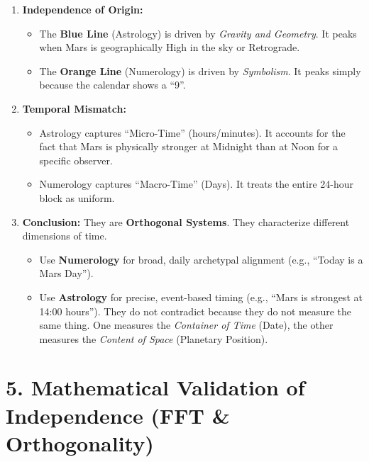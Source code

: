 \documentclass[
  11pt,
  oneside,
  openany]{scrbook}
\providecommand{\tightlist}{%
  \setlength{\itemsep}{0pt}\setlength{\parskip}{0pt}}\usepackage{longtable,booktabs,array}
\begin{document}
\begin{enumerate}
\def\labelenumi{\arabic{enumi}.}
\tightlist
\item
  \textbf{Independence of Origin:}

  \begin{itemize}
  \tightlist
  \item
    The \textbf{Blue Line} (Astrology) is driven by \emph{Gravity and
    Geometry}. It peaks when Mars is geographically High in the sky or
    Retrograde.
  \item
    The \textbf{Orange Line} (Numerology) is driven by \emph{Symbolism}.
    It peaks simply because the calendar shows a ``9''.
  \end{itemize}
\item
  \textbf{Temporal Mismatch:}

  \begin{itemize}
  \tightlist
  \item
    Astrology captures ``Micro-Time'' (hours/minutes). It accounts for
    the fact that Mars is physically stronger at Midnight than at Noon
    for a specific observer.
  \item
    Numerology captures ``Macro-Time'' (Days). It treats the entire
    24-hour block as uniform.
  \end{itemize}
\item
  \textbf{Conclusion:} They are \textbf{Orthogonal Systems}. They
  characterize different dimensions of time.

  \begin{itemize}
  \tightlist
  \item
    Use \textbf{Numerology} for broad, daily archetypal alignment (e.g.,
    ``Today is a Mars Day'').
  \item
    Use \textbf{Astrology} for precise, event-based timing (e.g., ``Mars
    is strongest at 14:00 hours''). They do not contradict because they
    do not measure the same thing. One measures the \emph{Container of
    Time} (Date), the other measures the \emph{Content of Space}
    (Planetary Position).
  \end{itemize}
\end{enumerate}

\chapter{5. Mathematical Validation of Independence (FFT \&
Orthogonality)}\label{mathematical-validation-of-independence-fft-orthogonality}
\end{document}

